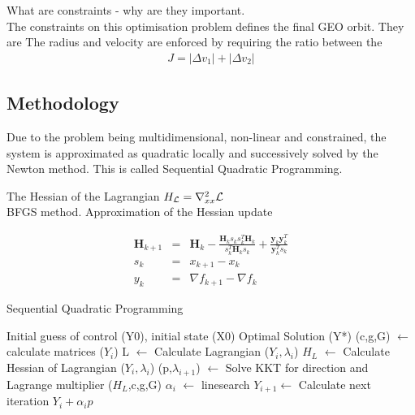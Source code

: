 \documentclass[Space3_Assign3.tex]{subfile}
\begin{document}
What are constraints - why are they important.\\
The constraints on this optimisation problem defines the final GEO orbit. They are  The radius and velocity are enforced by requiring the ratio between the 
\begin{eqnarray}
J = |\Delta v_1 | + |\Delta v_2| \label{costfn}
\end{eqnarray}






\subsection{Methodology}

Due to the problem being multidimensional, non-linear and constrained, the system is approximated as quadratic locally and successively solved by the Newton method. This is called Sequential Quadratic Programming.




The Hessian of the Lagrangian $H_{\mathcal{L}} = \nabla^2_{xx}\mathcal{L}$\\
BFGS method. Approximation of the Hessian update

\begin{eqnarray}
\bm{H}_{k+1} &=& \bm{H}_k - \frac{\bm{H}_k s_k s_k^T \bm{H}_k}{s_k^T \bm{H}_k s_k} + \frac{\bm{y}_k\bm{y}_k^T}{\bm{y}_k^T s_k}\\
s_k &=& x_{k+1} - x_k\\
y_k &=& \nabla f_{k+1} - \nabla f_k
\end{eqnarray}

\begin{algorithm}
\caption{Sequential Quadratic Programming} \label{PC:SQR}
\begin{algorithmic}
 Initial guess of control (Y0), initial state (X0)
 Optimal Solution (Y*)
\State (c,g,G) $\gets$ calculate matrices ($Y_i$)
\State L $\gets$ Calculate Lagrangian ($Y_i,\lambda_i$)
\State $H_L$ $\gets$ Calculate Hessian of Lagrangian ($Y_i,\lambda_i$)
\State (p,$\lambda_{i+1}$) $\gets$ Solve KKT for direction and Lagrange multiplier ($H_L$,c,g,G) 
\State $\alpha_i$ $\gets$ linesearch
\State $Y_{i+1} \gets$ Calculate next iteration $Y_i + \alpha_ip$
\EndWhile
\end{algorithmic}
\end{algorithm}
\end{document}
